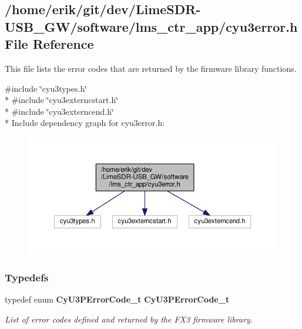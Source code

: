 \subsection{/home/erik/git/dev/\+Lime\+S\+D\+R-\/\+U\+S\+B\+\_\+\+G\+W/software/lms\+\_\+ctr\+\_\+app/cyu3error.h File Reference}
\label{cyu3error_8h}


This file lists the error codes that are returned by the firmware library functions.  


{\ttfamily \#include \char`\"{}cyu3types.\+h\char`\"{}}\\*
{\ttfamily \#include \char`\"{}cyu3externcstart.\+h\char`\"{}}\\*
{\ttfamily \#include \char`\"{}cyu3externcend.\+h\char`\"{}}\\*
Include dependency graph for cyu3error.\+h\+:
\nopagebreak
\begin{figure}[H]
\begin{center}
\leavevmode
\includegraphics[width=350pt]{d1/d1f/cyu3error_8h__incl}
\end{center}
\end{figure}
\subsubsection*{Typedefs}
\begin{DoxyCompactItemize}
\item 
typedef enum {\bf Cy\+U3\+P\+Error\+Code\+\_\+t} {\bf Cy\+U3\+P\+Error\+Code\+\_\+t}
\begin{DoxyCompactList}\small\item\em List of error codes defined and returned by the F\+X3 firmware library. \end{DoxyCompactList}\end{DoxyCompactItemize}
